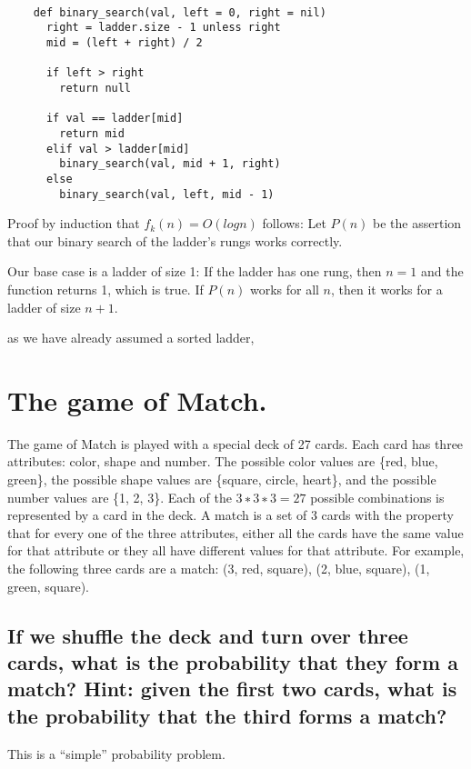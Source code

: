 \documentclass[titlepage]{article}\usepackage[]{graphicx}\usepackage[]{color}
\begin{document}
  \begin{lstlisting}

	def binary_search(val, left = 0, right = nil)
	  right = ladder.size - 1 unless right
	  mid = (left + right) / 2
 
	  if left > right
	  	return null
   
	  if val == ladder[mid]
		return mid
	  elif val > ladder[mid]
		binary_search(val, mid + 1, right)
	  else
		binary_search(val, left, mid - 1)

  \end{lstlisting}

  Proof by induction that $f_k(n) = O(log n)$ follows:
  Let $P(n)$ be the assertion that our binary search of the ladder's rungs
  works correctly. 

  Our base case is a ladder of size 1: If the ladder has one rung, then
  $n=1$ and the function returns 1, which is true. 
  If $P(n)$ works for all $n$, then it works for a ladder of size $n+1$. 

  as we have already assumed a sorted ladder,




  \section{ The game of Match. }
  The game of Match is played with a special deck of 27 cards. Each card has
  three attributes: color, shape and number. The possible color values are
  \{red, blue, green\}, the possible shape values are \{square, circle, heart\},
  and the possible number values are \{1, 2, 3\}. Each of the $3 ∗ 3 ∗ 3 = 27$
  possible combinations is represented by a card in the deck. A match is a set
  of 3 cards with the property that for every one of the three attributes,
  either all the cards have the same value for that attribute or they all have
  different values for that attribute. For example, the following three cards
  are a match: (3, red, square), (2, blue, square), (1, green, square).

  \subsection{If we shuffle the deck and turn over three cards, what is the
	  probability that they form a match? Hint: given the first two cards, what
  is the probability that the third forms a match?}

  This is a ``simple'' probability problem. 
\end{document}
